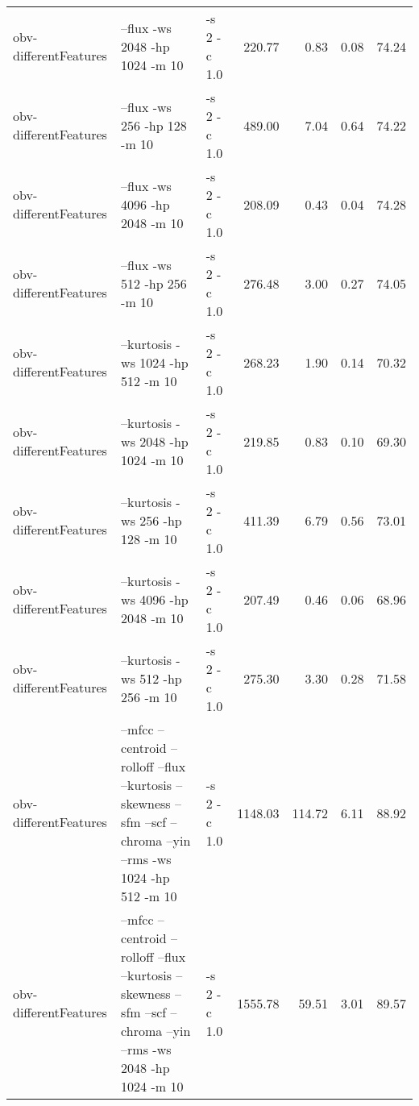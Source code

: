 \documentclass[11pt,a4paper]{article}
\begin{document}
\begin{tabular}{lllrrrr}
 obv-differentFeatures  &  --flux -ws 2048 -hp 1024 -m 10                                                                                     &  -s 2 -c 1.0  &   220.77  &    0.83  &   0.08  &  74.24  \\
 obv-differentFeatures  &  --flux -ws 256 -hp 128 -m 10                                                                                       &  -s 2 -c 1.0  &   489.00  &    7.04  &   0.64  &  74.22  \\
 obv-differentFeatures  &  --flux -ws 4096 -hp 2048 -m 10                                                                                     &  -s 2 -c 1.0  &   208.09  &    0.43  &   0.04  &  74.28  \\
 obv-differentFeatures  &  --flux -ws 512 -hp 256 -m 10                                                                                       &  -s 2 -c 1.0  &   276.48  &    3.00  &   0.27  &  74.05  \\
 obv-differentFeatures  &  --kurtosis -ws 1024 -hp 512 -m 10                                                                                  &  -s 2 -c 1.0  &   268.23  &    1.90  &   0.14  &  70.32  \\
 obv-differentFeatures  &  --kurtosis -ws 2048 -hp 1024 -m 10                                                                                 &  -s 2 -c 1.0  &   219.85  &    0.83  &   0.10  &  69.30  \\
 obv-differentFeatures  &  --kurtosis -ws 256 -hp 128 -m 10                                                                                   &  -s 2 -c 1.0  &   411.39  &    6.79  &   0.56  &  73.01  \\
 obv-differentFeatures  &  --kurtosis -ws 4096 -hp 2048 -m 10                                                                                 &  -s 2 -c 1.0  &   207.49  &    0.46  &   0.06  &  68.96  \\
 obv-differentFeatures  &  --kurtosis -ws 512 -hp 256 -m 10                                                                                   &  -s 2 -c 1.0  &   275.30  &    3.30  &   0.28  &  71.58  \\
 obv-differentFeatures  &  --mfcc --centroid --rolloff --flux --kurtosis --skewness --sfm --scf --chroma --yin --rms -ws 1024 -hp 512 -m 10   &  -s 2 -c 1.0  &  1148.03  &  114.72  &   6.11  &  88.92  \\
 obv-differentFeatures  &  --mfcc --centroid --rolloff --flux --kurtosis --skewness --sfm --scf --chroma --yin --rms -ws 2048 -hp 1024 -m 10  &  -s 2 -c 1.0  &  1555.78  &   59.51  &   3.01  &  89.57  \\

\end{tabular}
\end{document}
